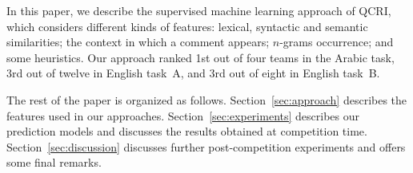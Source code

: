 In this paper, we describe the supervised machine learning approach of QCRI\@,
which considers different kinds of features: lexical, syntactic and semantic similarities; 
the context in which a comment appears; $n$-grams occurrence; and some 
heuristics. Our approach ranked 1st out of four teams in the 
Arabic task, 3rd out of twelve in English task~A, and 3rd out of eight in English task~B. 

The rest of the paper is organized as follows. Section~\ref{sec:approach} 
describes the features used in our approaches. Section~\ref{sec:experiments} 
describes our prediction models and discusses the results obtained at 
competition time. Section~\ref{sec:discussion} discusses further 
post-competition experiments and offers some final remarks.